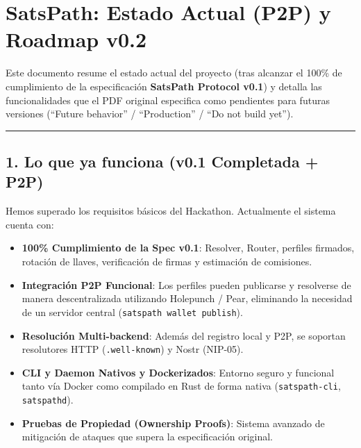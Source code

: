 \documentclass[
]{article}
\author{}
\date{}
\providecommand{\tightlist}{%
  \setlength{\itemsep}{0pt}\setlength{\parskip}{0pt}}
\begin{document}
\hypertarget{satspath-estado-actual-p2p-y-roadmap-v0.2}{%
\section{SatsPath: Estado Actual (P2P) y Roadmap
v0.2}\label{satspath-estado-actual-p2p-y-roadmap-v0.2}}

Este documento resume el estado actual del proyecto (tras alcanzar el
100\% de cumplimiento de la especificación \textbf{SatsPath Protocol
v0.1}) y detalla las funcionalidades que el PDF original especifica como
pendientes para futuras versiones (``Future behavior'' / ``Production''
/ ``Do not build yet'').

\begin{center}\rule{0.5\linewidth}{0.5pt}\end{center}

\hypertarget{lo-que-ya-funciona-v0.1-completada-p2p}{%
\subsection{1. Lo que ya funciona (v0.1 Completada +
P2P)}\label{lo-que-ya-funciona-v0.1-completada-p2p}}

Hemos superado los requisitos básicos del Hackathon. Actualmente el
sistema cuenta con:

\begin{itemize}
\tightlist
\item
  \textbf{100\% Cumplimiento de la Spec v0.1}: Resolver, Router,
  perfiles firmados, rotación de llaves, verificación de firmas y
  estimación de comisiones.
\item
  \textbf{Integración P2P Funcional}: Los perfiles pueden publicarse y
  resolverse de manera descentralizada utilizando Holepunch / Pear,
  eliminando la necesidad de un servidor central
  (\texttt{satspath\ wallet\ publish}).
\item
  \textbf{Resolución Multi-backend}: Además del registro local y P2P, se
  soportan resolutores HTTP (\texttt{.well-known}) y Nostr (NIP-05).
\item
  \textbf{CLI y Daemon Nativos y Dockerizados}: Entorno seguro y
  funcional tanto vía Docker como compilado en Rust de forma nativa
  (\texttt{satspath-cli}, \texttt{satspathd}).
\item
  \textbf{Pruebas de Propiedad (Ownership Proofs)}: Sistema avanzado de
  mitigación de ataques que supera la especificación original.
\end{itemize}
\end{document}
